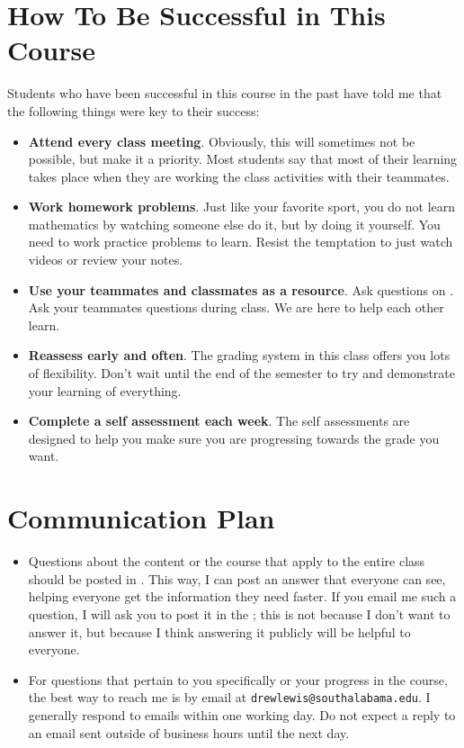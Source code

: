 \documentclass{article}
\begin{document}
\section*{\fontsize{12}{15}\selectfont How To Be Successful in This Course}
Students who have been successful in this course in the past have told me that the following things were key to their success:
\begin{itemize}
\item \textbf{Attend every class meeting}. Obviously, this will sometimes not be possible, but make it a priority. Most students say that most of their learning takes place when they are working the class activities with their teammates.
\item \textbf{Work homework problems}. Just like your favorite sport, you do not learn mathematics by watching someone else do it, but by doing it yourself. You need to work practice problems to learn. Resist the temptation to just watch videos or review your notes.
\item \textbf{Use your teammates and classmates as a resource}. Ask questions on \LMS. Ask your teammates questions during class. We are here to help each other learn.
\item \textbf{Reassess early and often}. The grading system in this class offers you lots of flexibility. Don't wait until the end of the semester to try and demonstrate your learning of everything.
\item \textbf{Complete a self assessment each week}. The self assessments are designed to help you make sure you are progressing towards the grade you want. 
\end{itemize}

\section*{\fontsize{12}{15}\selectfont Communication Plan}

\begin{itemize}
\item Questions about the content or the course that apply to the entire class should be posted in \LMS. This way, I can post an answer that everyone can see, helping everyone get the information they need faster. If you email me such a question, I will ask you to post it in the \LMS ; this is not because I don't want to answer it, but because I think answering it publicly will be helpful to everyone.
\item For questions that pertain to you specifically or your progress in the course, the best way to reach me is by email at {\tt drewlewis@southalabama.edu}. I generally respond to emails within one working day.  Do not expect a reply to an email sent outside of business hours until the next day.
\end{itemize}
\end{document}
